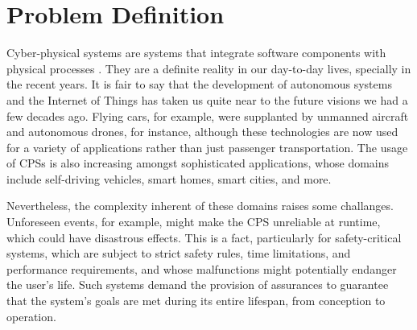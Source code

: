 


\section{Problem Definition}

Cyber-physical systems are systems that integrate software components with physical processes \cite{lee2008cyber}. They are a definite reality in our day-to-day lives, specially in the recent years. It is fair to say that the development of autonomous systems and the Internet of Things has taken us quite near to the future visions we had a few decades ago. Flying cars, for example, were supplanted by unmanned aircraft and autonomous drones, for instance, although these technologies are now used for a variety of applications rather than just passenger transportation. The usage of CPSs is also increasing amongst sophisticated applications, whose domains include self-driving vehicles, smart homes, smart cities, and more.

Nevertheless, the complexity inherent of these domains raises some challanges. Unforeseen events, for example, might make the CPS unreliable at runtime, which could have disastrous effects. This is a fact, particularly for safety-critical systems, which are subject to strict safety rules, time limitations, and performance requirements, and whose malfunctions might potentially endanger the user's life. Such systems demand the provision of assurances to guarantee that the system's goals are met during its entire lifespan, from conception to operation. 



